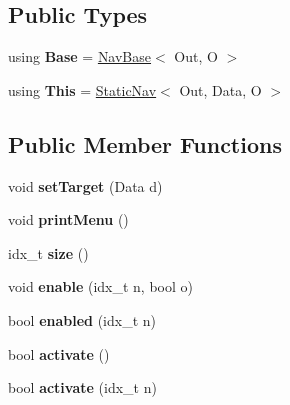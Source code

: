 \subsection*{Public Types}
\begin{DoxyCompactItemize}
\item 
\mbox{\label{classStaticNav_a2f3bcbf88851bf7f3a996f601a4e7b2a}} 
using {\bfseries Base} = \hyperlink{classNavBase}{Nav\+Base}$<$ Out, O $>$
\item 
\mbox{\label{classStaticNav_a0cd2b778a1ae3fdb1ce623cdcc0ff648}} 
using {\bfseries This} = \hyperlink{classStaticNav}{Static\+Nav}$<$ Out, Data, O $>$
\end{DoxyCompactItemize}
\subsection*{Public Member Functions}
\begin{DoxyCompactItemize}
\item 
\mbox{\label{classStaticNav_a03fef842273f435c094e09d9f11870f1}} 
void {\bfseries set\+Target} (Data d)
\item 
\mbox{\label{classStaticNav_adf54cd9e3451116ed8c0c38a964e23ae}} 
void {\bfseries print\+Menu} ()
\item 
\mbox{\label{classStaticNav_a53b3197546f76215945321ee88a60fa9}} 
idx\+\_\+t {\bfseries size} ()
\item 
\mbox{\label{classStaticNav_a7ba688dae4101e447866d1fa046d3764}} 
void {\bfseries enable} (idx\+\_\+t n, bool o)
\item 
\mbox{\label{classStaticNav_a98ccf85a6268a4c6cab16f80589511c9}} 
bool {\bfseries enabled} (idx\+\_\+t n)
\item 
\mbox{\label{classStaticNav_acdf792e96538be6b67f9e6c78fd8117f}} 
bool {\bfseries activate} ()
\item 
\mbox{\label{classStaticNav_a9b0a9573993822097b3370a528ab8828}} 
bool {\bfseries activate} (idx\+\_\+t n)
\end{DoxyCompactItemize}
